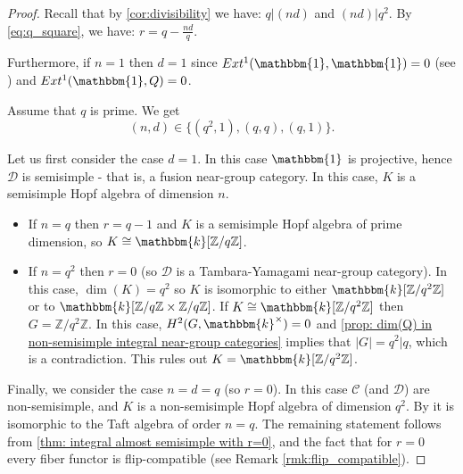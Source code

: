 \documentclass{amsart}
\theoremstyle{plain}%
\theoremstyle{remark}
\newcommand{\C}{\mathcal{C}}
\newcommand{\1}{\mathbbm{1}}
\newcommand{\D}{\mathcal{D}}
\newcommand{\N}{\mathbb{N}}
\newcommand{\Z}{\mathbb{Z}}
\newcommand{\kk}{\mathbbm{k}}
\begin{document}
    \begin{proof}
   
        Recall that by \cref{cor:divisibility} we have: $q\rvert (nd)$ and $(nd) \rvert q^2$. By \cref{eq:q_square}, we have: $r=q-\frac{nd}{q}$.
        
        Furthermore, if $n=1$ then $d=1$ since $Ext^1(\1, \1)=0$ (see \cite[Theorem 4.4.1]{EGNO}) and $Ext^1(\1, Q)=0$. 

        Assume that $q$ is prime. We get $$(n,d)\in \{(q^2, 1), (q,q), (q,1)\}.$$

        Let us first consider the case $d=1$. In this case $\1$ is projective, hence $\D$ is semisimple - that is, a fusion near-group category. In this case, $K$ is a semisimple Hopf algebra of dimension $n$. 
\begin{itemize}
    \item  If $n=q$ then $r=q-1$ and $K$ is a semisimple Hopf algebra of prime dimension, so $K\cong \kk[\Z/q\Z]$. 
    \item If $n=q^2$ then $r=0$ (so $\D$ is a Tambara-Yamagami near-group category). In this case, $\dim(K)=q^2$ so $K$ is isomorphic to either $\kk[\Z/q^2\Z]$ or to $\kk[\Z/q\Z\times \Z/q\Z]$. If $K\cong \kk[\Z/q^2\Z]$ then $G=\Z/q^2\Z$. In this case, $H^2(G, \kk^\times)=0$ and \cref{prop: dim(Q) in non-semisimple integral near-group categories} implies that $|G|=q^2 | q$, which is a contradiction. This rules out $K = \kk[\Z/q^2\Z]$.
  
\end{itemize}

      Finally, we consider the case $n=d=q$ (so $r=0$). In this case $\C$ (and $\D$) are non-semisimple, and $K$ is a non-semisimple Hopf algebra of dimension $q^2$. By \cite{Ng} it is isomorphic to the Taft algebra of order $n=q$. The remaining statement follows from \cref{thm: integral almost semisimple with r=0}, and the fact that for $r=0$ every fiber functor is flip-compatible (see Remark \ref{rmk:flip_compatible}).

      
    
    

\end{proof}
\end{document}
